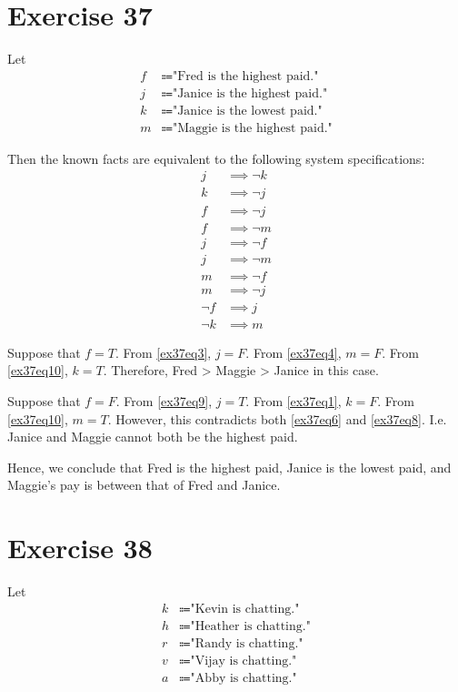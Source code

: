 \documentclass{article}
\begin{document}
\pagebreak

\section{Exercise 37}
Let
\begin{align*}
	f & \Coloneqq \text{"Fred is the highest paid."}   \\
	j & \Coloneqq \text{"Janice is the highest paid."} \\
	k & \Coloneqq \text{"Janice is the lowest paid."}  \\
	m & \Coloneqq \text{"Maggie is the highest paid."}
\end{align*}

Then the known facts are equivalent to the following system specifications:
\begin{align}
	j      & \implies \neg k \label{ex37eq1} \\
	k      & \implies \neg j \label{ex37eq2} \\
	f      & \implies \neg j \label{ex37eq3} \\
	f      & \implies \neg m \label{ex37eq4} \\
	j      & \implies \neg f \label{ex37eq5} \\
	j      & \implies \neg m \label{ex37eq6} \\
	m      & \implies \neg f \label{ex37eq7} \\
	m      & \implies \neg j \label{ex37eq8} \\
	\neg f & \implies j \label{ex37eq9}      \\
	\neg k & \implies m \label{ex37eq10}
\end{align}

Suppose that $f = T$. From \eqref{ex37eq3}, $j = F$. From \eqref{ex37eq4}, $m = F$. From \eqref{ex37eq10}, $k = T$. Therefore, Fred > Maggie > Janice in this case.

Suppose that $f = F$. From \eqref{ex37eq9}, $j = T$. From \eqref{ex37eq1}, $k = F$. From \eqref{ex37eq10}, $m = T$. However, this contradicts both \eqref{ex37eq6} and \eqref{ex37eq8}. I.e. Janice and Maggie cannot both be the highest paid.

Hence, we conclude that Fred is the highest paid, Janice is the lowest paid, and Maggie's pay is between that of Fred and Janice.

\pagebreak

\section{Exercise 38}
Let
\begin{align*}
	k & \Coloneqq \text{"Kevin is chatting."}   \\
	h & \Coloneqq \text{"Heather is chatting."} \\
	r & \Coloneqq \text{"Randy is chatting."}   \\
	v & \Coloneqq \text{"Vijay is chatting."}   \\
	a & \Coloneqq \text{"Abby is chatting."}
\end{align*}
\end{document}
